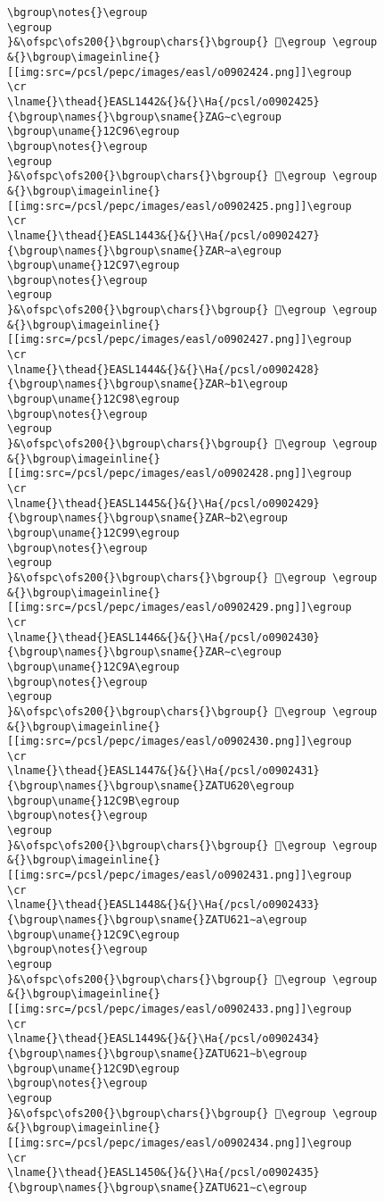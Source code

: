 \begin{verbatim}
\bgroup\notes{}\egroup
\egroup
}&\ofspc\ofs200{}\bgroup\chars{}\bgroup{} 𒲕\egroup \egroup
&{}\bgroup\imageinline{}[[img:src=/pcsl/pepc/images/easl/o0902424.png]]\egroup
\cr
\lname{}\thead{}EASL1442&{}&{}\Ha{/pcsl/o0902425}{\bgroup\names{}\bgroup\sname{}ZAG∼c\egroup
\bgroup\uname{}12C96\egroup
\bgroup\notes{}\egroup
\egroup
}&\ofspc\ofs200{}\bgroup\chars{}\bgroup{} 𒲖\egroup \egroup
&{}\bgroup\imageinline{}[[img:src=/pcsl/pepc/images/easl/o0902425.png]]\egroup
\cr
\lname{}\thead{}EASL1443&{}&{}\Ha{/pcsl/o0902427}{\bgroup\names{}\bgroup\sname{}ZAR∼a\egroup
\bgroup\uname{}12C97\egroup
\bgroup\notes{}\egroup
\egroup
}&\ofspc\ofs200{}\bgroup\chars{}\bgroup{} 𒲗\egroup \egroup
&{}\bgroup\imageinline{}[[img:src=/pcsl/pepc/images/easl/o0902427.png]]\egroup
\cr
\lname{}\thead{}EASL1444&{}&{}\Ha{/pcsl/o0902428}{\bgroup\names{}\bgroup\sname{}ZAR∼b1\egroup
\bgroup\uname{}12C98\egroup
\bgroup\notes{}\egroup
\egroup
}&\ofspc\ofs200{}\bgroup\chars{}\bgroup{} 𒲘\egroup \egroup
&{}\bgroup\imageinline{}[[img:src=/pcsl/pepc/images/easl/o0902428.png]]\egroup
\cr
\lname{}\thead{}EASL1445&{}&{}\Ha{/pcsl/o0902429}{\bgroup\names{}\bgroup\sname{}ZAR∼b2\egroup
\bgroup\uname{}12C99\egroup
\bgroup\notes{}\egroup
\egroup
}&\ofspc\ofs200{}\bgroup\chars{}\bgroup{} 𒲙\egroup \egroup
&{}\bgroup\imageinline{}[[img:src=/pcsl/pepc/images/easl/o0902429.png]]\egroup
\cr
\lname{}\thead{}EASL1446&{}&{}\Ha{/pcsl/o0902430}{\bgroup\names{}\bgroup\sname{}ZAR∼c\egroup
\bgroup\uname{}12C9A\egroup
\bgroup\notes{}\egroup
\egroup
}&\ofspc\ofs200{}\bgroup\chars{}\bgroup{} 𒲚\egroup \egroup
&{}\bgroup\imageinline{}[[img:src=/pcsl/pepc/images/easl/o0902430.png]]\egroup
\cr
\lname{}\thead{}EASL1447&{}&{}\Ha{/pcsl/o0902431}{\bgroup\names{}\bgroup\sname{}ZATU620\egroup
\bgroup\uname{}12C9B\egroup
\bgroup\notes{}\egroup
\egroup
}&\ofspc\ofs200{}\bgroup\chars{}\bgroup{} 𒲛\egroup \egroup
&{}\bgroup\imageinline{}[[img:src=/pcsl/pepc/images/easl/o0902431.png]]\egroup
\cr
\lname{}\thead{}EASL1448&{}&{}\Ha{/pcsl/o0902433}{\bgroup\names{}\bgroup\sname{}ZATU621∼a\egroup
\bgroup\uname{}12C9C\egroup
\bgroup\notes{}\egroup
\egroup
}&\ofspc\ofs200{}\bgroup\chars{}\bgroup{} 𒲜\egroup \egroup
&{}\bgroup\imageinline{}[[img:src=/pcsl/pepc/images/easl/o0902433.png]]\egroup
\cr
\lname{}\thead{}EASL1449&{}&{}\Ha{/pcsl/o0902434}{\bgroup\names{}\bgroup\sname{}ZATU621∼b\egroup
\bgroup\uname{}12C9D\egroup
\bgroup\notes{}\egroup
\egroup
}&\ofspc\ofs200{}\bgroup\chars{}\bgroup{} 𒲝\egroup \egroup
&{}\bgroup\imageinline{}[[img:src=/pcsl/pepc/images/easl/o0902434.png]]\egroup
\cr
\lname{}\thead{}EASL1450&{}&{}\Ha{/pcsl/o0902435}{\bgroup\names{}\bgroup\sname{}ZATU621∼c\egroup

\end{verbatim}
